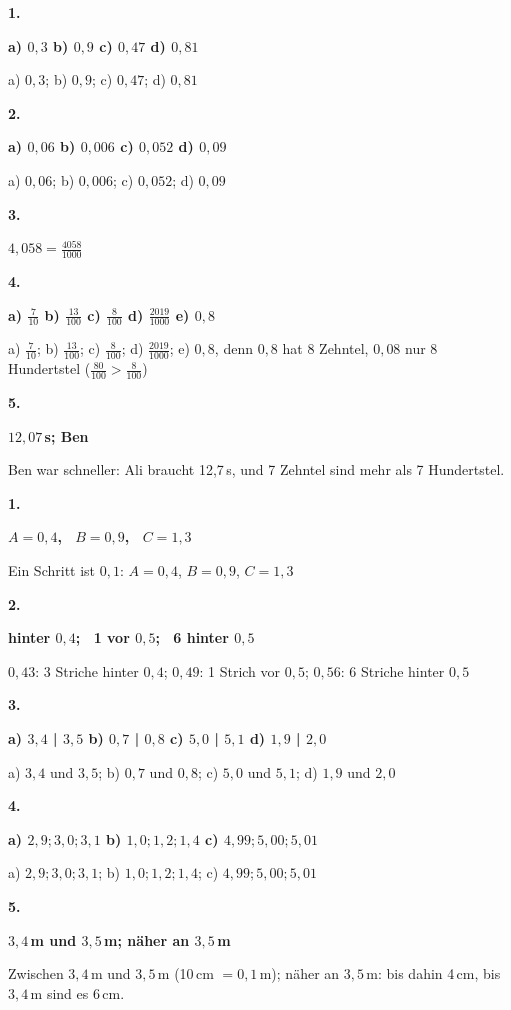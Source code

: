 \documentclass[11pt]{article}
\newcommand{\lsg}[3]{\par\noindent\begin{minipage}[t]{9mm}\textbf{#1}\end{minipage}%
  \begin{minipage}[t]{52mm}\raggedright\bfseries\boldmath #2\end{minipage}\hspace{3mm}%
  \begin{minipage}[t]{\dimexpr\linewidth-64mm\relax}\raggedright\small #3\end{minipage}\par\vspace{4pt}}
\begin{document}
\par\smallskip
{}\par
\par\Needspace{25mm}\vspace{6pt}\noindent\colorbox{black!12}{}\hspace{2mm}{\bfseries Zehntel, Hundertstel, Tausendstel}\par\vspace{4pt}
\lsg{1.}{a) $0{,}3$ \quad b) $0{,}9$ \quad c) $0{,}47$ \quad d) $0{,}81$}{a) $0{,}3$; b) $0{,}9$; c) $0{,}47$; d) $0{,}81$}
\lsg{2.}{a) $0{,}06$ \quad b) $0{,}006$ \quad c) $0{,}052$ \quad d) $0{,}09$}{a) $0{,}06$; b) $0{,}006$; c) $0{,}052$; d) $0{,}09$}
\lsg{3.}{$4{,}058 = \frac{4058}{1000}$}{}
\lsg{4.}{a) $\frac{7}{10}$ \quad b) $\frac{13}{100}$ \quad c) $\frac{8}{100}$ \quad d) $\frac{2019}{1000}$ \quad e) $0{,}8$}{a) $\frac{7}{10}$; b) $\frac{13}{100}$; c) $\frac{8}{100}$; d) $\frac{2019}{1000}$; e) $0{,}8$, denn $0{,}8$ hat 8 Zehntel, $0{,}08$ nur 8 Hundertstel ($\frac{80}{100} > \frac{8}{100}$)}
\lsg{5.}{$12{,}07$\,s; Ben}{Ben war schneller: Ali braucht 12{,}7\,s, und 7 Zehntel sind mehr als 7 Hundertstel.}
\par\Needspace{25mm}\vspace{6pt}\noindent\colorbox{black!12}{}\hspace{2mm}{\bfseries Am Zahlenstrahl: ablesen, eintragen, weiterzählen}\par\vspace{4pt}
\lsg{1.}{$A = 0{,}4$, \ $B = 0{,}9$, \ $C = 1{,}3$}{Ein Schritt ist $0{,}1$: $A = 0{,}4$, $B = 0{,}9$, $C = 1{,}3$}
\lsg{2.}{3 hinter $0{,}4$; \ 1 vor $0{,}5$; \ 6 hinter $0{,}5$}{$0{,}43$: 3 Striche hinter $0{,}4$; $0{,}49$: 1 Strich vor $0{,}5$; $0{,}56$: 6 Striche hinter $0{,}5$}
\lsg{3.}{a) $3{,}4$ | $3{,}5$ \quad b) $0{,}7$ | $0{,}8$ \quad c) $5{,}0$ | $5{,}1$ \quad d) $1{,}9$ | $2{,}0$}{a) $3{,}4$ und $3{,}5$; b) $0{,}7$ und $0{,}8$; c) $5{,}0$ und $5{,}1$; d) $1{,}9$ und $2{,}0$}
\lsg{4.}{a) $2{,}9; 3{,}0; 3{,}1$ \quad b) $1{,}0; 1{,}2; 1{,}4$ \quad c) $4{,}99; 5{,}00; 5{,}01$}{a) $2{,}9; 3{,}0; 3{,}1$; b) $1{,}0; 1{,}2; 1{,}4$; c) $4{,}99; 5{,}00; 5{,}01$}
\lsg{5.}{$3{,}4$\,m und $3{,}5$\,m; näher an $3{,}5$\,m}{Zwischen $3{,}4$\,m und $3{,}5$\,m (10\,cm $= 0{,}1$\,m); näher an $3{,}5$\,m: bis dahin 4\,cm, bis $3{,}4$\,m sind es 6\,cm.}
\end{document}
